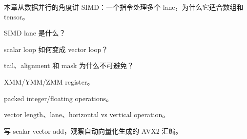 {本章从数据并行的角度讲 SIMD：一个指令处理多个 lane，为什么它适合数组和 tensor。}
{\item SIMD lane 是什么？
\item scalar loop 如何变成 vector loop？
\item tail、alignment 和 mask 为什么不可避免？}
{\item XMM/YMM/ZMM register。
\item packed integer/floating operations。
\item vector length、lane、horizontal vs vertical operation。}
{写 scalar vector add，观察自动向量化生成的 AVX2 汇编。}

